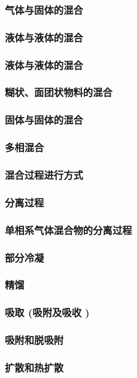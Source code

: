 \documentclass[UTF8]{../../ApplicationUniverse}
\begin{document}
        \subsubsection{气体与固体的混合}
        \subsubsection{液体与液体的混合}
        \subsubsection{液体与液体的混合}
        \subsubsection{糊状、面团状物料的混合}
        \subsubsection{固体与固体的混合}
        \subsubsection{多相混合}
    \subsubsection{混合过程进行方式}
\subsubsection{分离过程}
    \subsubsection{单相系气体混合物的分离过程}
        \subsubsection{部分冷凝}
        \subsubsection{精馏}
        \subsubsection{吸取 (吸附及吸收 )}
        \subsubsection{吸附和脱吸附}
        \subsubsection{扩散和热扩散}
\end{document}
